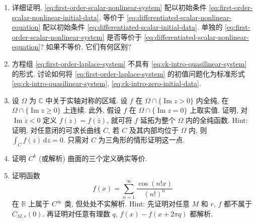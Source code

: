 \begin{enumerate}[label=\thesection.\arabic*.,ref=\thesection.\arabic*,start=7,series=book-problems]
\item\label{ex:reduced-initial-problem-equivalence} 详细证明, \eqref{eq:first-order-scalar-nonlinear-system} 配以初始条件 \eqref{eq:first-order-scalar-nonlinear-initial-data}, 等价于 \eqref{eq:differentiated-scalar-nonlinear-equation} 配以初始条件 \eqref{eq:differentiated-scalar-initial-data}. 单独的 \eqref{eq:first-order-scalar-nonlinear-system} 是否等价于 \eqref{eq:differentiated-scalar-nonlinear-equation}? 如果不等价, 它们有何区别?

\item\label{ex:laplace-system-standard-form} 方程组 \eqref{eq:first-order-laplace-system} 不具有 \eqref{eq:ck-intro-quasilinear-system} 的形式. 讨论如何将 \eqref{eq:first-order-laplace-system} 的初值问题化为标准形式 \eqref{eq:ck-intro-quasilinear-system}, \eqref{eq:ck-intro-zero-initial-data}.

\item\label{ex:schwarz-reflection-principle} 设 $\Omega$ 为 $\mathbb{C}$ 中关于实轴对称的区域. 设 $f$ 在 $\Omega\cap\{\operatorname{Im}z>0\}$ 内全纯, 在 $\Omega\cap\{\operatorname{Im}z\geq0\}$ 上连续. 此外, 假设 $f$ 在 $\Omega\cap\{\operatorname{Im}z=0\}$ 上取实值. 证明, 对 $\operatorname{Im}z<0$ 定义 $f(z)=\overline{f(\bar z)}$, 就可将 $f$ 延拓为整个 $\Omega$ 内的全纯函数. Hint: 证明, 对任意闭的可求长曲线 $C$, 若 $C$ 及其内部均位于 $\Omega$ 内, 则 $\int_Cf(z)\,\mathrm{d}z=0$. 只需对 $C$ 为三角形的情形证明这一点.

\item\label{ex:surface-descriptions-equivalent} 证明 $C^k$ (或解析) 曲面的三个定义确实等价.

\item\label{ex:smooth-nowhere-analytic-function} 证明函数
\begin{equation}\label{eq:smooth-nowhere-analytic-series}
f(x)=\sum_{n=1}^{\infty}\dfrac{\cos(n!x)}{(n!)^n}
\end{equation}
在 $\mathbb{R}$ 上属于 $C^\infty$ 类, 但处处不实解析. Hint: 先证明对任意 $M$ 和 $r$, $f$ 都不属于 $C_{M,r}(0)$. 再证明对任意有理数 $q$, $f(x)-f(x+2\pi q)$ 都解析.

\end{enumerate}
